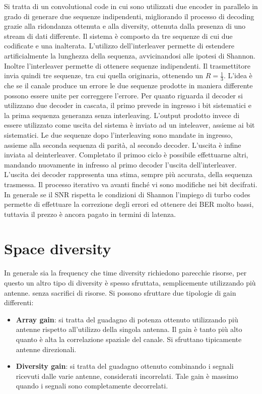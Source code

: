 Si tratta di un convolutional code in cui sono utilizzati due encoder in parallelo in grado di generare due sequenze indipendenti, migliorando il processo di decoding grazie alla ridondanza ottenuta e alla diversity, ottenuta dalla presenza di uno stream di dati differente.
Il sistema è composto da tre sequenze di cui due codificate e una inalterata. L'utilizzo dell'interleaver permette di estendere artificialmente la lunghezza della sequenza, avvicinandosi alle ipotesi di Shannon. Inoltre l'interleaver permette di ottenere sequenze indipendenti. 
Il trasmettitore invia quindi tre sequenze, tra cui quella originaria, ottenendo un $R=\frac{1}{3}$. L'idea è che se il canale produce un errore le due sequenze prodotte in maniera differente possono essere unite  per correggere l'errore.
Per quanto riguarda il decoder si utilizzano due decoder in cascata, il primo prevede in ingresso i bit sistematici e la prima sequenza generanza senza interleaving. L'output prodotto invece di essere utilizzato come uscita del sistema è inviato ad un inteleaver, assieme ai bit sistematici. 
Le due sequenze dopo l'interleaving sono mandate in ingresso, assieme alla seconda sequenza di parità, al secondo decoder. L'uscita è infine inviata al deinterleaver. Completato il primoo ciclo è possibile effettuarne altri, mandando nuovamente in infresso al primo decoder l'uscita dell'interleaver. 
L'uscita dei decoder rappresenta una stima, sempre più accurata, della sequenza trasmessa. Il processo iterativo va avanti finché vi sono modifiche nei bit decifrati.
In generale se il SNR rispetta le condizioni di Shannon l'impiego di turbo codes permette di effettuare la correzione degli errori ed ottenere dei BER molto bassi, tuttavia il prezzo è ancora pagato in termini di latenza.



\section*{Space diversity}
In generale sia la frequency che time diversity richiedono parecchie risorse, per questo un altro tipo di diversity è spesso sfruttata, semplicemente utilizzando più antenne. senza sacrifici di risorse. Si possono sfruttare due tipologie di gain differenti:
\begin{itemize}
    \item \textbf{Array gain}: si tratta del guadagno di potenza ottenuto utilizzando più antenne rispetto all'utilizzo della singola antenna. Il gain è tanto più alto quanto è alta la correlazione spaziale del canale. Si sfruttano tipicamente antenne direzionali.
    \item \textbf{Diversity gain}: si tratta del guadagno ottenuto combinando i segnali ricevuti dalle varie antenne, considerati incorrelati. Tale gain è massimo quando i segnali sono completamente decorrelati. 
\end{itemize} 

